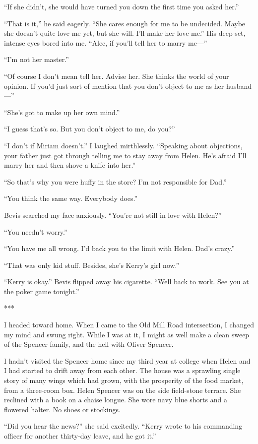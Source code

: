\documentclass{novel}
\begin{document}
{“If she didn’t, she would have turned you down the first time you asked her.”

“That is it,” he said eagerly. “She cares enough for me to be undecided. Maybe she doesn’t quite love me yet, but she will. I’ll make her love me.” His deep-set, intense eyes bored into me. “Alec, if you’ll tell her to marry me—”

“I’m not her master.”

“Of course I don’t mean tell her. Advise her. She thinks the world of your opinion. If you’d just sort of mention that you don’t object to me as her husband—”

“She’s got to make up her own mind.”

“I guess that’s so. But you don’t object to me, do you?”

“I don’t if Miriam doesn’t.” I laughed mirthlessly. “Speaking about objections, your father just got through telling me to stay away from Helen. He’s afraid I’ll marry her and then shove a knife into her.”

“So that’s why you were huffy in the store? I’m not responsible for Dad.”

“You think the same way. Everybody does.”

Bevis searched my face anxiously. “You’re not still in love with Helen?”

“You needn’t worry.”

“You have me all wrong. I’d back you to the limit with Helen. Dad’s crazy.”

“That was only kid stuff. Besides, she’s Kerry’s girl now.”

“Kerry is okay.” Bevis flipped away his cigarette. “Well back to work. See you at the poker game tonight.”

***

I headed toward home. When I came to the Old Mill Road intersection, I changed my mind and swung right. While I was at it, I might as well make a clean sweep of the Spencer family, and the hell with Oliver Spencer.

I hadn’t visited the Spencer home since my third year at college when Helen and I had started to drift away from each other. The house was a sprawling single story of many wings which had grown, with the prosperity of the food market, from a three-room box. Helen Spencer was on the side field-stone terrace. She reclined with a book on a chaise longue. She wore navy blue shorts and a flowered halter. No shoes or stockings.

“Did you hear the news?” she said excitedly. “Kerry wrote to his commanding officer for another thirty-day leave, and he got it.”

}
\end{document}
